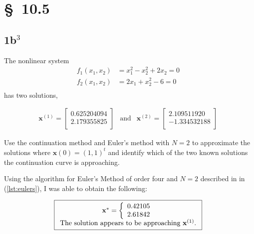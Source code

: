 \documentclass[12pt]{article}
\begin{document}
\begin{minipage}[h]{1.0\linewidth}
  
\end{minipage}

\section{\S~10.5}
\subsection{1b$^3$}
The nonlinear system
\begin{align*}
  f_1(x_1,x_2)&=x_1^2-x_2^2+2x_2 =0 \\
  f_2(x_1,x_2)&=2x_1+x_2^2-6 =0 \\
\end{align*}
has two solutions,

\begin{equation*}
  \begin{array}{ccc}
    \mathbf{x}^{(1)}=
    \begin{bmatrix}
      0.625204094 \\
      2.179355825 \\
    \end{bmatrix}
    &
    \mathrm{and}
    &
    \mathbf{x}^{(2)}=
    \begin{bmatrix}
      2.109511920 \\
      -1.334532188 \\
    \end{bmatrix}
  \end{array}
\end{equation*}

Use the continuation method and Euler's method with $N=2$ to approximate the
solutions where $\mathbf{x}(0)=(1,1)^t$ and identify which of the two known
solutions the continuation curve is approaching.

Using the algorithm for Euler's Method of order four and $N=2$ described in
in~\texttt{} (\cref{lst:eulers}), I was able to obtain the following:

\begin{equation*}
  \boxed{
    \begin{array}[h]{cc}
    \mathbf{x}^*= \left\{
      \begin{array}{c}
        0.42105 \\
        2.61842 \\
      \end{array}
    \right.\\
    \text{The solution appears to be approaching }\mathbf{x}^{(1)}\text{.}
  \end{array}
  }
\end{equation*}
\begin{minipage}[h]{1.0\linewidth}
  
\end{minipage}
\end{document}
